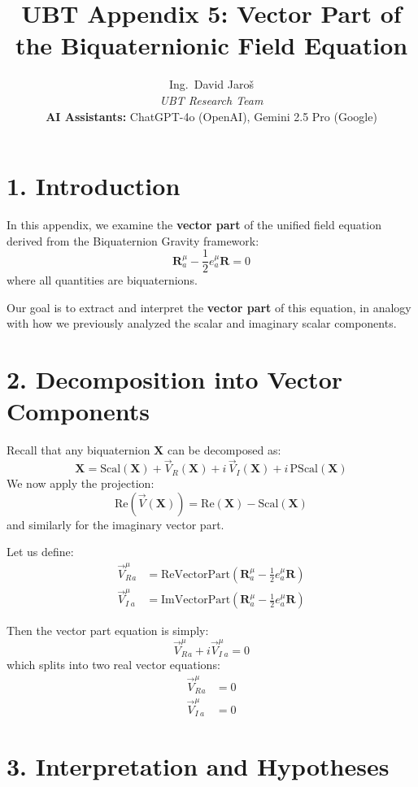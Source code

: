\documentclass[12pt]{article}
\title{UBT Appendix 5: Vector Part of the Biquaternionic Field Equation}
\author{
Ing.~David Jaroš \\
\textit{UBT Research Team} \\
\textbf{AI Assistants:} ChatGPT-4o (OpenAI), Gemini 2.5 Pro (Google) \\
}
\date{}
\begin{document}
\maketitle

\section*{1. Introduction}

In this appendix, we examine the \textbf{vector part} of the unified field equation derived from the Biquaternion Gravity framework:
\begin{equation}
\mathbf{R}^\mu_a - \frac{1}{2} e^\mu_a \mathbf{R} = 0
\end{equation}
where all quantities are biquaternions.

Our goal is to extract and interpret the \textbf{vector part} of this equation, in analogy with how we previously analyzed the scalar and imaginary scalar components.

\section*{2. Decomposition into Vector Components}

Recall that any biquaternion $\mathbf{X}$ can be decomposed as:
\[
\mathbf{X} = \text{Scal}(\mathbf{X}) + \vec{V}_R(\mathbf{X}) + i \, \vec{V}_I(\mathbf{X}) + i \, \text{PScal}(\mathbf{X})
\]
We now apply the projection:
\[
\text{Re}(\vec{V}(\mathbf{X})) = \text{Re}(\mathbf{X}) - \text{Scal}(\mathbf{X})
\]
and similarly for the imaginary vector part.

Let us define:
\begin{align}
\vec{V}_R^\mu_a &= \text{ReVectorPart}(\mathbf{R}^\mu_a - \tfrac{1}{2} e^\mu_a \mathbf{R}) \\
\vec{V}_I^\mu_a &= \text{ImVectorPart}(\mathbf{R}^\mu_a - \tfrac{1}{2} e^\mu_a \mathbf{R})
\end{align}

Then the vector part equation is simply:
\begin{equation}
\vec{V}_R^\mu_a + i \vec{V}_I^\mu_a = 0
\end{equation}
which splits into two real vector equations:
\begin{align}
\vec{V}_R^\mu_a &= 0 \\
\vec{V}_I^\mu_a &= 0
\end{align}

\section*{3. Interpretation and Hypotheses}
\end{document}
